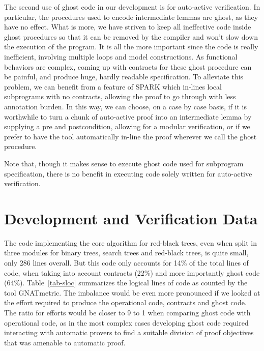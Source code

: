\documentclass{llncs}
\begin{document}
The second use of ghost code in our development is for auto-active verification. In particular, the procedures
used to encode intermediate lemmas are ghost, as they have no effect. What is more, we have striven to
keep all ineffective code inside ghost procedures so that it can be removed by the compiler and won't
slow down the execution of the program. It is all the more important since the code is really inefficient, involving
multiple loops and model constructions. As functional behaviors are complex, coming up with contracts for
these ghost procedure can be painful, and produce huge, hardly readable specification. To alleviate this
problem, we can benefit from a feature of SPARK which in-lines local subprograms with no contracts, allowing
the proof to go through with less annotation burden. In this way, we can choose, on a case by case basis, if
it is worthwhile to turn a chunk of auto-active proof into an intermediate lemma by supplying a pre and
postcondition, allowing for a modular verification, or if we prefer to have the tool automatically in-line the
proof wherever we call the ghost procedure.

Note that, though it makes sense to execute ghost code used for subprogram specification, there is no benefit in
executing code solely written for auto-active verification.

\section{Development and Verification Data}

The code implementing the core algorithm for red-black trees, even when split
in three modules for binary trees, search trees and red-black trees, is quite
small, only 286 lines overall. But this code only accounts for 14\% of the
total lines of code, when taking into account contracts (22\%) and more
importantly ghost code (64\%). Table~\ref{tab-sloc} summarizes the logical
lines of code as counted by the tool GNATmetric. The imbalance would be even
more pronounced if we looked at the effort required to produce the operational
code, contracts and ghost code. The ratio for efforts would be closer to 9 to 1
when comparing ghost code with operational code, as in the most complex cases
developing ghost code required interacting with automatic provers to find a
suitable division of proof objectives that was amenable to automatic proof.
\end{document}
